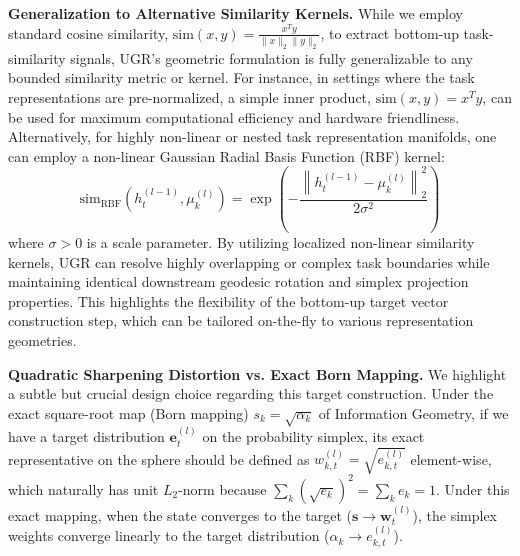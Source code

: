 \textbf{Generalization to Alternative Similarity Kernels.} 
While we employ standard cosine similarity, $\text{sim}(x, y) = \frac{x^T y}{\|x\|_2 \|y\|_2}$, to extract bottom-up task-similarity signals, UGR's geometric formulation is fully generalizable to any bounded similarity metric or kernel. For instance, in settings where the task representations are pre-normalized, a simple inner product, $\text{sim}(x, y) = x^T y$, can be used for maximum computational efficiency and hardware friendliness. Alternatively, for highly non-linear or nested task representation manifolds, one can employ a non-linear Gaussian Radial Basis Function (RBF) kernel:
\begin{equation}
\text{sim}_{\text{RBF}}(h_t^{(l-1)}, \mu_k^{(l)}) = \exp\left(-\frac{\left\|h_t^{(l-1)} - \mu_k^{(l)}\right\|_2^2}{2\sigma^2}\right)
\end{equation}
where $\sigma > 0$ is a scale parameter. By utilizing localized non-linear similarity kernels, UGR can resolve highly overlapping or complex task boundaries while maintaining identical downstream geodesic rotation and simplex projection properties. This highlights the flexibility of the bottom-up target vector construction step, which can be tailored on-the-fly to various representation geometries.

\textbf{Quadratic Sharpening Distortion vs. Exact Born Mapping.}
We highlight a subtle but crucial design choice regarding this target construction. Under the exact square-root map (Born mapping) $s_k = \sqrt{\alpha_k}$ of Information Geometry, if we have a target distribution $\mathbf{e}_t^{(l)}$ on the probability simplex, its exact representative on the sphere should be defined as $w_{k, t}^{(l)} = \sqrt{e_{k, t}^{(l)}}$ element-wise, which naturally has unit $L_2$-norm because $\sum_k (\sqrt{e_k})^2 = \sum_k e_k = 1$. Under this exact mapping, when the state converges to the target ($\mathbf{s} \to \mathbf{w}_t^{(l)}$), the simplex weights converge linearly to the target distribution ($\alpha_k \to e_{k, t}^{(l)}$). 

